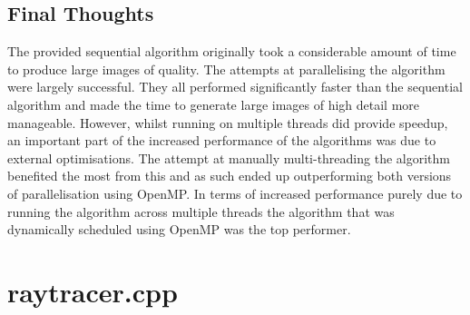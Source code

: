 \documentclass[12pt,journal,transmag]{IEEEtran}
\begin{document}
	\subsection{Final Thoughts}
	The provided sequential algorithm originally took a considerable amount of time to produce large images of quality. The attempts at parallelising the algorithm were largely successful. They all performed significantly faster than the sequential algorithm and made the time to generate large images of high detail more manageable. However, whilst running on multiple threads did provide speedup, an important part of the increased performance of the algorithms was due to external optimisations. The attempt at manually multi-threading the algorithm benefited the most from this and as such ended up outperforming both versions of parallelisation using OpenMP. In terms of increased performance purely due to running the algorithm across multiple threads the algorithm that was dynamically scheduled using OpenMP was the top performer.
	
	
	
	
	\newpage
	\onecolumn
	\appendices
	\section{raytracer.cpp}
	
	
\end{document}
